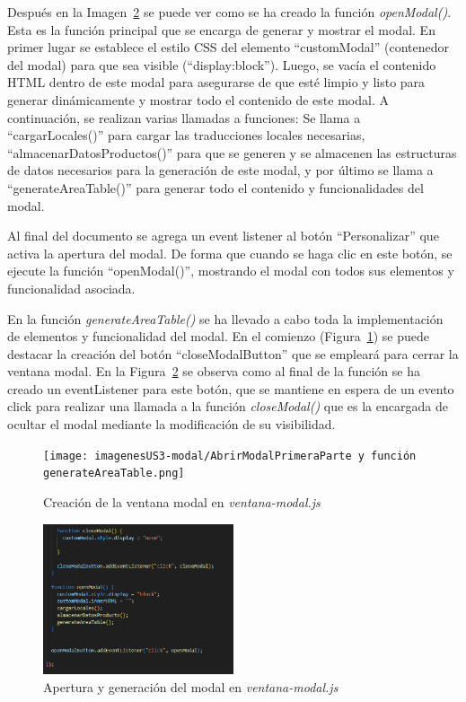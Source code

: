 \documentclass[12pt]{article}
\begin{document}
Después en la Imagen~\ref{fig:finaljs} se puede ver como se ha creado la función \textit{openModal()}. Esta es la función principal que se encarga
de generar y mostrar el modal. En primer lugar se establece el estilo CSS del elemento ``customModal'' (contenedor del modal) para que sea visible (``display:block'').
Luego, se vacía el contenido HTML dentro de este modal para asegurarse de que esté limpio y listo para generar dinámicamente y mostrar todo el contenido de este modal.
A continuación, se realizan varias llamadas a funciones: Se llama a ``cargarLocales()'' para cargar las traducciones locales necesarias, ``almacenarDatosProductos()'' para que se generen
y se almacenen las estructuras de datos necesarios para la generación de este modal, y por último se llama a ``generateAreaTable()'' para generar todo el contenido y funcionalidades
del modal. 

Al final del documento se agrega un event listener al botón ``Personalizar'' que activa la apertura del modal. De forma que cuando se haga clic en este botón, se 
ejecute la función ``openModal()'', mostrando el modal con todos sus elementos y funcionalidad asociada.

En la función \textit{generateAreaTable()} se ha llevado a cabo toda la implementación de elementos y funcionalidad del modal. En el comienzo (Figura~\ref{fig:iniciojs}) se puede destacar la creación del botón
``closeModalButton'' que se empleará para cerrar la ventana modal. En la Figura~\ref{fig:finaljs} se observa como al final de la función se ha creado un eventListener para este botón, que se mantiene en espera de un evento
click para realizar una llamada a la función \textit{closeModal()} que es la encargada de ocultar el modal mediante la modificación de su visibilidad.

\begin{figure}[ht]
    \centering
    \texttt{[image: imagenesUS3-modal/AbrirModalPrimeraParte y función generateAreaTable.png]}
    \caption{\label{fig:iniciojs} Creación de la ventana modal en \textit{ventana-modal.js}}
    \vspace{\fill}
\end{figure}

\begin{figure}[ht]
    \centering
    \includegraphics[width=0.5\textwidth]{imagenesUS3-modal/FinalDeOpenModal.png}
    \caption{\label{fig:finaljs} Apertura y generación del modal en \textit{ventana-modal.js}}
    \vspace{\fill}
\end{figure}
\end{document}
